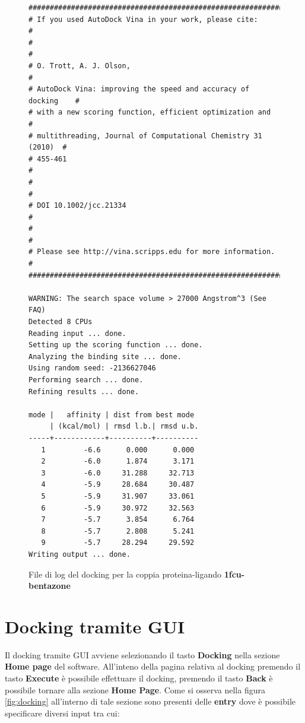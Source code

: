 \begin{figure}[H]
\begin{verbatim}
#################################################################
# If you used AutoDock Vina in your work, please cite:          #
#                                                               #
# O. Trott, A. J. Olson,                                        #
# AutoDock Vina: improving the speed and accuracy of docking    #
# with a new scoring function, efficient optimization and       #
# multithreading, Journal of Computational Chemistry 31 (2010)  #
# 455-461                                                       #
#                                                               #
# DOI 10.1002/jcc.21334                                         #
#                                                               #
# Please see http://vina.scripps.edu for more information.      #
#################################################################

WARNING: The search space volume > 27000 Angstrom^3 (See FAQ)
Detected 8 CPUs
Reading input ... done.
Setting up the scoring function ... done.
Analyzing the binding site ... done.
Using random seed: -2136627046
Performing search ... done.
Refining results ... done.

mode |   affinity | dist from best mode
     | (kcal/mol) | rmsd l.b.| rmsd u.b.
-----+------------+----------+----------
   1         -6.6      0.000      0.000
   2         -6.0      1.874      3.171
   3         -6.0     31.288     32.713
   4         -5.9     28.684     30.487
   5         -5.9     31.907     33.061
   6         -5.9     30.972     32.563
   7         -5.7      3.854      6.764
   8         -5.7      2.808      5.241
   9         -5.7     28.294     29.592
Writing output ... done.
\end{verbatim}
\caption{File di log del docking per la coppia proteina-ligando \textbf{1fcu-bentazone}}
\label{fig:file di log}
\end{figure}

\section{Docking tramite GUI}
Il docking tramite GUI avviene selezionando il tasto \textbf{Docking} nella sezione \textbf{Home page} del software. All'inteno della pagina relativa al docking premendo il tasto \textbf{Execute} è possibile effettuare il docking, premendo il tasto \textbf{Back} è possibile tornare alla sezione \textbf{Home Page}.
Come si osserva nella figura \ref{fig:docking} all'interno di tale sezione sono presenti delle \textbf{entry} dove è possibile specificare diversi input tra cui:

